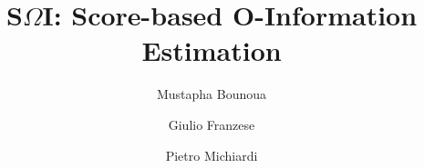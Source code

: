 

\usepackage[english]{babel}
\usepackage{calc}
\usepackage[absolute,overlay]{textpos}
\usepackage{graphicx}

\usepackage{amsmath}
\usepackage{amsfonts}
\usepackage{mathtools}
\usepackage{comment}
\usepackage{MnSymbol,wasysym}
\usepackage{tikz}
\usepackage{subcaption}
\usepackage{cancel}
\usepackage{color}
\usepackage{siunitx}
\usepackage{array}
\usepackage{multirow}
\usepackage{amssymb}
\usepackage{gensymb}
\usepackage{tabularx}
\usepackage{extarrows}
\usepackage{booktabs}
\usepackage{svg}
\usepackage{qrcode}
\usepackage[ruled,vlined]{algorithm2e}
\newcommand\mycommfont[1]{\footnotesize\ttfamily\textcolor{blue}{#1}}

\usepackage{physics}




\usetikzlibrary{fadings}
\usetikzlibrary{patterns}
\usetikzlibrary{shadows.blur}
\usetikzlibrary{shapes}








\usepackage[backend=bibtex,firstinits=true,maxnames=3,maxcitenames=3,url=false,style=authoryear]{biblatex}

\setlength\bibitemsep{0.3cm} %
\renewcommand{\bibfont}{\normalfont\scriptsize}
\renewcommand{\cite}[1]{\footnote<.->[frame]{\fullcite{#1}}}


\title{S$\Omega$I: Score-based O-Information Estimation }

\author{Mustapha Bounoua  \and Giulio Franzese  \and Pietro Michiardi }
